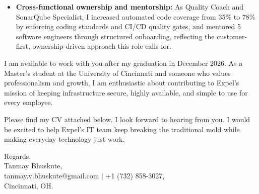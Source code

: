 \documentclass[11pt]{letter}
\begin{document}
\begin{letter}{}
\begin{itemize}[leftmargin=*, itemsep=0.45em]
    \item \textbf{Cross-functional ownership and mentorship:} As Quality Coach and SonarQube Specialist, I increased automated code coverage from 35\% to 78\% by enforcing coding standards and CI/CD quality gates, and mentored 5 software engineers through structured onboarding, reflecting the customer-first, ownership-driven approach this role calls for.
\end{itemize}

I am available to work with you after my graduation in December 2026. As a Master's student at the University of Cincinnati and someone who values professionalism and growth, I am enthusiastic about contributing to Expel's mission of keeping infrastructure secure, highly available, and simple to use for every employee.

Please find my CV attached below. I look forward to hearing from you. I would be excited to help Expel's IT team keep breaking the traditional mold while making everyday technology just work.

{\setlength{\parskip}{0pt}
Regards,\\
Tanmay Bhuskute,\\
tanmay.v.bhuskute@gmail.com $\mid$ +1 (732) 858-3027,\\
Cincinnati, OH.
}

\end{letter}
\end{document}
